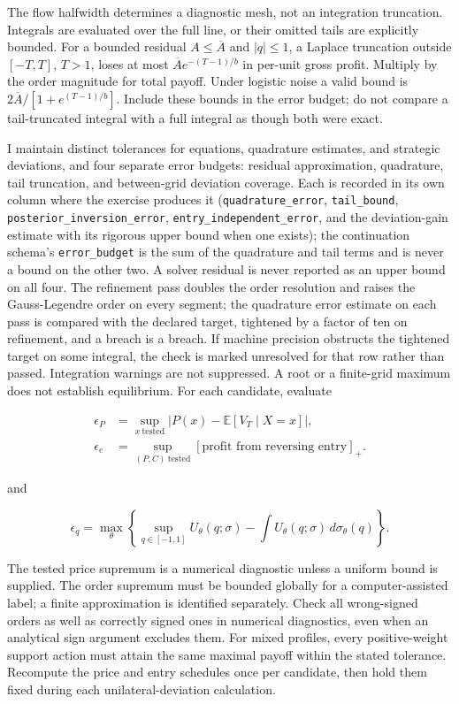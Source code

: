 \documentclass[
  11pt,
]{article}
\begin{document}
The flow halfwidth determines a diagnostic mesh, not an integration
truncation. Integrals are evaluated over the full line, or their omitted
tails are explicitly bounded. For a bounded residual \(A\le\overline A\)
and \(|q|\le1\), a Laplace truncation outside \([-T,T]\), \(T>1\), loses
at most \(\overline A e^{-(T-1)/b}\) in per-unit gross profit. Multiply
by the order magnitude for total payoff. Under logistic noise a valid
bound is \(2\overline A/[1+e^{(T-1)/b}]\). Include these bounds in the
error budget; do not compare a tail-truncated integral with a full
integral as though both were exact.

I maintain distinct tolerances for equations, quadrature estimates, and
strategic deviations, and four separate error budgets: residual
approximation, quadrature, tail truncation, and between-grid deviation
coverage. Each is recorded in its own column where the exercise produces
it (\texttt{quadrature\_error}, \texttt{tail\_bound},
\texttt{posterior\_inversion\_error},
\texttt{entry\_independent\_error}, and the deviation-gain estimate with
its rigorous upper bound when one exists); the continuation schema's
\texttt{error\_budget} is the sum of the quadrature and tail terms and
is never a bound on the other two. A solver residual is never reported
as an upper bound on all four. The refinement pass doubles the order
resolution and raises the Gauss-Legendre order on every segment; the
quadrature error estimate on each pass is compared with the declared
target, tightened by a factor of ten on refinement, and a breach is a
breach. If machine precision obstructs the tightened target on some
integral, the check is marked unresolved for that row rather than
passed. Integration warnings are not suppressed. A root or a finite-grid
maximum does not establish equilibrium. For each candidate, evaluate

\[
\begin{aligned}
\epsilon_P&=\sup_{x\ \mathrm{tested}}|P(x)-\mathbb E[V_T\mid X=x]|,\\
\epsilon_e&=\sup_{(P,C)\ \mathrm{tested}}[\text{profit from reversing entry}]_+.
\end{aligned}
\tag{OA.75}\label{eq:oa-oa-75}
\]

and

\[
\epsilon_q=\max_\theta\left\{\sup_{q\in[-1,1]}U_\theta(q;\sigma)-\int U_\theta(q;\sigma)\,d\sigma_\theta(q)\right\}.
\tag{OA.76}\label{eq:oa-oa-76}
\]

The tested price supremum is a numerical diagnostic unless a uniform
bound is supplied. The order supremum must be bounded globally for a
computer-assisted label; a finite approximation is identified
separately. Check all wrong-signed orders as well as correctly signed
ones in numerical diagnostics, even when an analytical sign argument
excludes them. For mixed profiles, every positive-weight support action
must attain the same maximal payoff within the stated tolerance.
Recompute the price and entry schedules once per candidate, then hold
them fixed during each unilateral-deviation calculation.
\end{document}
